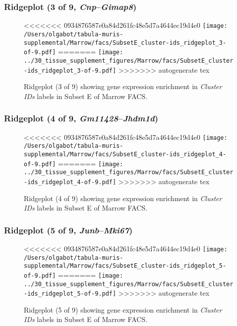 \clearpage

\subsubsection{Ridgeplot (3 of 9, \emph{Cnp}--\emph{Gimap8})}
\begin{figure}[h]
\centering
<<<<<<< 0934876587e0a84d261fc48e5d7a4644ec19d4e0
\texttt{[image: /Users/olgabot/tabula-muris-supplemental/Marrow/facs/SubsetE\_cluster-ids\_ridgeplot\_3-of-9.pdf]}
=======
\texttt{[image: ../30\_tissue\_supplement\_figures/Marrow/facs/SubsetE\_cluster-ids\_ridgeplot\_3-of-9.pdf]}
>>>>>>> autogenerate tex

\caption{ Ridgeplot (3 of 9)  showing gene expression enrichment in \emph{Cluster IDs} labels in Subset E of Marrow FACS. }
\end{figure}


\clearpage

\subsubsection{Ridgeplot (4 of 9, \emph{Gm11428}--\emph{Jhdm1d})}
\begin{figure}[h]
\centering
<<<<<<< 0934876587e0a84d261fc48e5d7a4644ec19d4e0
\texttt{[image: /Users/olgabot/tabula-muris-supplemental/Marrow/facs/SubsetE\_cluster-ids\_ridgeplot\_4-of-9.pdf]}
=======
\texttt{[image: ../30\_tissue\_supplement\_figures/Marrow/facs/SubsetE\_cluster-ids\_ridgeplot\_4-of-9.pdf]}
>>>>>>> autogenerate tex

\caption{ Ridgeplot (4 of 9)  showing gene expression enrichment in \emph{Cluster IDs} labels in Subset E of Marrow FACS. }
\end{figure}


\clearpage

\subsubsection{Ridgeplot (5 of 9, \emph{Junb}--\emph{Mki67})}
\begin{figure}[h]
\centering
<<<<<<< 0934876587e0a84d261fc48e5d7a4644ec19d4e0
\texttt{[image: /Users/olgabot/tabula-muris-supplemental/Marrow/facs/SubsetE\_cluster-ids\_ridgeplot\_5-of-9.pdf]}
=======
\texttt{[image: ../30\_tissue\_supplement\_figures/Marrow/facs/SubsetE\_cluster-ids\_ridgeplot\_5-of-9.pdf]}
>>>>>>> autogenerate tex

\caption{ Ridgeplot (5 of 9)  showing gene expression enrichment in \emph{Cluster IDs} labels in Subset E of Marrow FACS. }
\end{figure}


